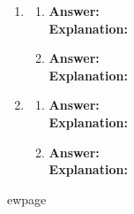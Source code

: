 \documentclass{article}
\begin{document}
\thispagestyle{fancy} %
\begin{enumerate}
	\item 
	\begin{enumerate}
		\item \textbf{Answer:}  \\
        \textbf{Explanation:} \\
        \item \textbf{Answer:} \\
        \textbf{Explanation:} \\
	\end{enumerate}
	\item 
	\begin{enumerate}
		\item \textbf{Answer:}  \\
        \textbf{Explanation:} \\
		\item \textbf{Answer:} \\
        \textbf{Explanation:} \\
	\end{enumerate}
\end{enumerate}

ewpage
\end{document}
